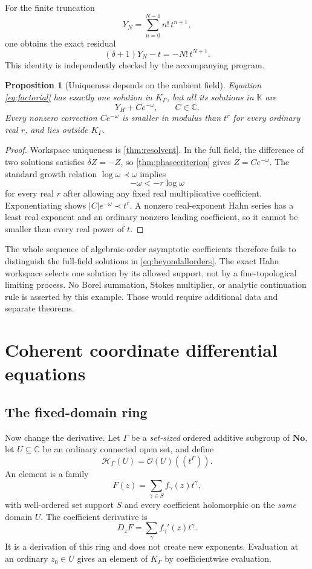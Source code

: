 \documentclass[11pt,letterpaper]{article}
\numberwithin{equation}{section}
\newtheorem{proposition}[theorem]{Proposition}
\theoremstyle{definition}
\theoremstyle{remark}
\newcommand{\No}{\mathbf{No}}
\newcommand{\K}{\mathbb K}
\newcommand{\C}{\mathbb C}
\newcommand{\OO}{\mathcal O}
\newcommand{\HH}{\mathcal H}
\begin{document}
For the finite truncation
\[
 Y_N=\sum_{n=0}^{N-1}n!\,t^{n+1},
\]
one obtains the exact residual
\begin{equation}\label{eq:factorialresidual}
 (\delta+1)Y_N-t=-N!\,t^{N+1}.
\end{equation}
This identity is independently checked by the accompanying program.

\begin{proposition}[Uniqueness depends on the ambient field]\label{prop:factorialambiguity}
Equation \eqref{eq:factorial} has exactly one solution in $K_\Gamma$, but all its solutions in $\K$ are
\begin{equation}\label{eq:beyondallorders}
 Y_H+C e^{-\omega},\qquad C\in\C.
\end{equation}
Every nonzero correction $Ce^{-\omega}$ is smaller in modulus than $t^r$ for every ordinary real $r$, and lies outside $K_\Gamma$.
\end{proposition}
\begin{proof}
Workspace uniqueness is \cref{thm:resolvent}. In the full field, the difference of two solutions satisfies $\delta Z=-Z$, so \cref{thm:phasecriterion} gives $Z=Ce^{-\omega}$. The standard growth relation $\log\omega\prec\omega$ implies
\[
 -\omega<-r\log\omega
\]
for every real $r$ after allowing any fixed real multiplicative coefficient. Exponentiating shows $|C|e^{-\omega}\prec t^r$. A nonzero real-exponent Hahn series has a least real exponent and an ordinary nonzero leading coefficient, so it cannot be smaller than every real power of $t$.
\end{proof}

The whole sequence of algebraic-order asymptotic coefficients therefore fails to distinguish the full-field solutions in \eqref{eq:beyondallorders}. The exact Hahn workspace selects one solution by its allowed support, not by a fine-topological limiting process. No Borel summation, Stokes multiplier, or analytic continuation rule is asserted by this example. Those would require additional data and separate theorems.

\section{Coherent coordinate differential equations}\label{sec:coordinate}

\subsection{The fixed-domain ring}
Now change the derivative. Let $\Gamma$ be a \emph{set-sized} ordered additive subgroup of $\No$, let $U\subseteq\C$ be an ordinary connected open set, and define
\begin{equation}\label{eq:coherentring}
 \HH_\Gamma(U)=\OO(U)((t^\Gamma)).
\end{equation}
An element is a family
\[
 F(z)=\sum_{\gamma\in S}f_\gamma(z)t^\gamma,
\]
with well-ordered set support $S$ and every coefficient holomorphic on the \emph{same} domain $U$. The coefficient derivative is
\[
 D_zF=\sum_\gamma f_\gamma'(z)t^\gamma.
\]
It is a derivation of this ring and does not create new exponents. Evaluation at an ordinary $z_0\in U$ gives an element of $K_\Gamma$ by coefficientwise evaluation.
\end{document}
